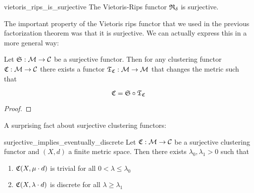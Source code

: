 \begin{myremark}{}{vietoris_rips_is_surjective}
    The Vietoris-Rips functor $\mathfrak{R}_\delta$ is surjective.
\end{myremark}

The important property of the Vietoris rips functor that we used in the previous factorization theorem was that it is surjective. We can actually express this in a more general way:

\begin{proposition}{}{}
    Let $\mathfrak{S}: \mathcal{M} \to \mathcal{C}$ be a surjective functor. Then for any clustering functor $\mathfrak{C}: \mathcal{M} \to \mathcal{C}$ there exists a functor $\mathfrak{T}_{\mathfrak{C}}: \mathcal{M} \to \mathcal{M}$ that changes the metric such that

    \begin{equation*}
        \mathfrak{C} = \mathfrak{S} \circ \mathfrak{T}_{\mathfrak{C}}
    \end{equation*}

    \newresult
\end{proposition}

\begin{proof}
    \newresult[]
\end{proof}

A surprising fact about surjective clustering functors:

\begin{lemma}{}{surjective_implies_eventually_discrete}
    Let $\mathfrak{C}: \mathcal{M} \to \mathcal{C}$ be a surjective clustering functor and $(X,d)$ a finite metric space. Then there exists $\lambda_0,\lambda_1 > 0$ such that
    \begin{enumerate}
        \item $\mathfrak{C}(X,\mu \cdot d)$ is trivial for all $0 < \lambda \le \lambda_0$
        \item $\mathfrak{C}(X,\lambda \cdot d)$ is discrete for all $\lambda \ge \lambda_1$
    \end{enumerate}

    \newresult
\end{lemma}

